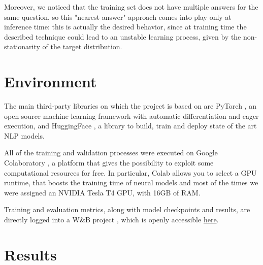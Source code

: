 \documentclass[a4paper,10pt]{report}
\begin{document}
Moreover, we noticed that the training set does not have multiple answers for the same question, so this "nearest answer" approach comes into play only at inference time: this is actually the desired behavior, since at training time the described technique could lead to an unstable learning process, given by the non-stationarity of the target distribution.

\section{Environment}
The main third-party libraries on which the project is based on are PyTorch \cite{pytorch}, an open source machine learning framework with automatic differentiation and eager execution, and HuggingFace \cite{hugginface}, a library to build, train and deploy state of the art NLP models.

All of the training and validation processes were executed on Google Colaboratory \cite{colab}, a platform that gives the possibility to exploit some computational resources for free. In particular, Colab allows you to select a GPU runtime, that boosts the training time of neural models and most of the times we were assigned an NVIDIA Tesla T4 GPU, with 16GB of RAM. 

Training and evaluation metrics, along with model checkpoints and results, are directly logged into a W\&B project \cite{wandb}, which is openly accessible \href{https://wandb.ai/wadaboa/squad-qa}{here}.

\section{Results}
\end{document}
